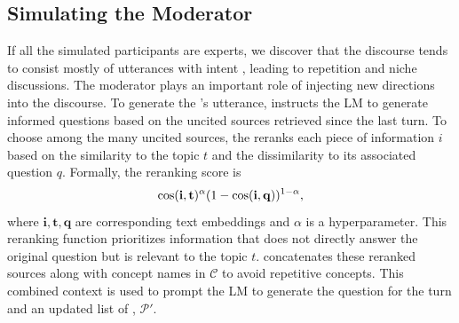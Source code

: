\subsection{Simulating the Moderator}
\label{sec:simulate_moderator}

If all the simulated participants are experts, we discover that the discourse tends to consist mostly of utterances with  intent , leading to repetition and niche discussions. The moderator plays an important role of injecting new directions into the discourse.  
To generate the \moderator's utterance, \system instructs the LM to generate informed questions based on the uncited sources retrieved since the last \moderator turn. To choose among the many uncited sources, the \moderator reranks each piece of information $i$ based on the similarity to the topic $t$ and the dissimilarity to its associated question $q$. 
Formally, the reranking score is 
\begin{equation}\nonumber
    \operatorname{cos}(\mathbf{i}, \mathbf{t})^{\alpha} (1- \operatorname{cos}(\mathbf{i}, \mathbf{q}))^{1-\alpha},
\vspace{-0.5em}
\label{eq:rerank_score}
\end{equation}
where $\mathbf{i}, \mathbf{t}, \mathbf{q}$ are corresponding text embeddings and $\alpha$ is a hyperparameter. This reranking function prioritizes information that does not directly answer the original question but is relevant to the topic $t$. \system concatenates these reranked sources along with concept names in $\mathcal{C}$ to avoid repetitive concepts. This combined context is used to prompt the LM to generate the question for the \moderator turn and an updated list of \experts, $\mathcal{P}'$.








